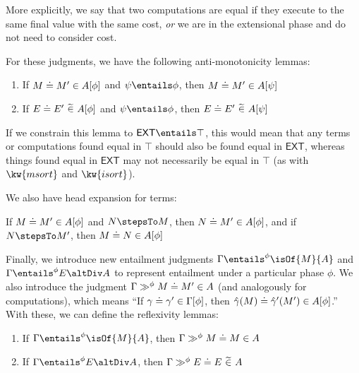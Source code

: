 \documentclass[letterpaper]{article}
\newcommand{\EXT}{\textsf{EXT}}
\newcommand{\gyat}{\hat{\gamma}}
\begin{document}
More explicitly, we say that two computations are equal if they execute to the same final value with the same cost, \textit{or} we are in the extensional phase and do not need to consider cost.

\bigskip

For these judgments, we have the following anti-monotonicity lemmas:
\begin{lemma}\label{lem:anti-mono}\phantom{nextline}
    \begin{enumerate}
        \item If $M\mathrel{\doteq}M' \in A [\phi]$ and $\psi \entails \phi$, then $M\mathrel{\doteq}M' \in A [\psi]$
        \item If $E\mathrel{\doteq}E'\ \widetilde{\in}\ A [\phi]$ and $\psi \entails \phi$, then $E\mathrel{\doteq}E'\ \widetilde{\in}\ A [\psi]$
    \end{enumerate}
\end{lemma}

If we constrain this lemma to $\EXT \entails \top$, this would mean that any terms or computations found equal in $\top$ should also be found equal in $\EXT$,
whereas things found equal in $\EXT$ may not necessarily be equal in $\top$ (as with $\kw{msort}$ and $\kw{isort}$).

We also have head expansion for terms:
\begin{lemma}\label{lem:he}
    If $M\mathrel{\doteq}M' \in A [\phi]$ and $N \stepsTo M$, then $N\mathrel{\doteq}M' \in A [\phi]$, and if $N \stepsTo M'$, then $M\mathrel{\doteq}N \in A [\phi]$
\end{lemma}

Finally, we introduce new entailment judgments $\Gamma \entailsPhase{\phi} \isOf{M}{A}$ and $\Gamma \entailsPhase{\phi} E \altDiv A$ to represent entailment under a particular phase $\phi$.
We also introduce the judgment $\Gamma \gg^\phi M\mathrel{\doteq}M' \in A$ (and analogously for computations), which means ``If $\gamma\mathrel{\doteq}\gamma' \in \Gamma [\phi]$, then $\exEqOfPhase{\gyat(M)}{\gyat'(M')}{A}{\phi}$.''
With these, we can define the reflexivity lemmas:
\begin{lemma}\label{lem:refl}\phantom{nextline}
    \begin{enumerate}
        \item If $\Gamma \entailsPhase{\phi} \isOf{M}{A}$, then $\Gamma \gg^\phi M\mathrel{\doteq}M \in A$
        \item If $\Gamma \entailsPhase{\phi} E \altDiv A$, then $\Gamma \gg^\phi E\mathrel{\doteq}E\ \widetilde{\in}\ A$
    \end{enumerate}
\end{lemma}
\end{document}
